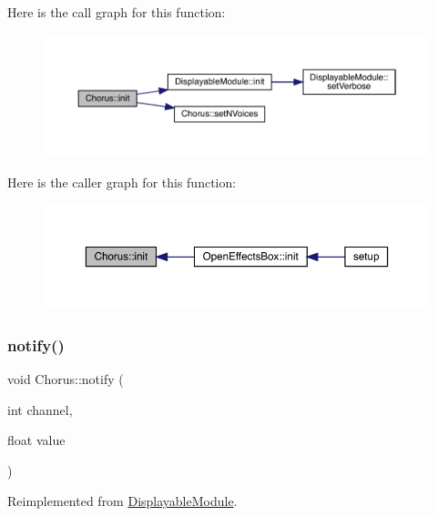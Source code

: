 Here is the call graph for this function\+:\nopagebreak
\begin{figure}[H]
\begin{center}
\leavevmode
\includegraphics[width=350pt]{class_chorus_a234b46541693909b60a21cf644bd5926_cgraph}
\end{center}
\end{figure}
Here is the caller graph for this function\+:\nopagebreak
\begin{figure}[H]
\begin{center}
\leavevmode
\includegraphics[width=350pt]{class_chorus_a234b46541693909b60a21cf644bd5926_icgraph}
\end{center}
\end{figure}
\mbox{\label{class_chorus_acb22e9cc93011859d1ae02b05a7388f5}} 
\subsubsection{\texorpdfstring{notify()}{notify()}}
{\footnotesize\ttfamily void Chorus\+::notify (\begin{DoxyParamCaption}\item[{int}]{channel,  }\item[{float}]{value }\end{DoxyParamCaption})\hspace{0.3cm}{\ttfamily [virtual]}}



Reimplemented from \mbox{\hyperlink{class_displayable_module_a8ae5383931f10c54cff2feef2bc07dee}{Displayable\+Module}}.

